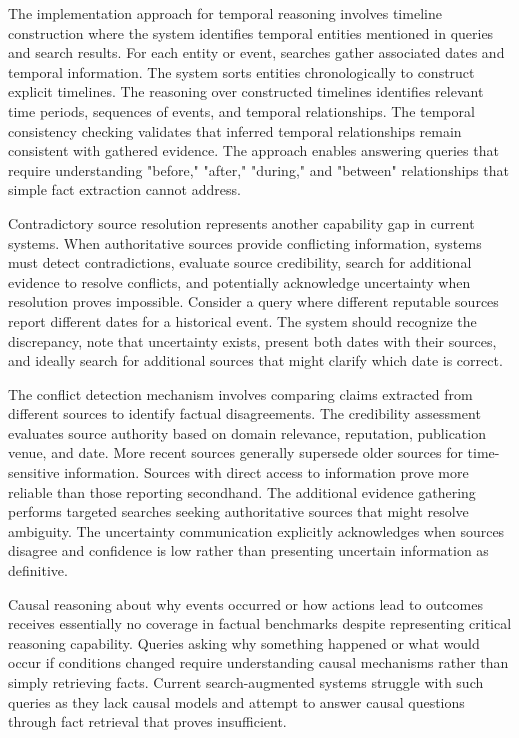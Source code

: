 The implementation approach for temporal reasoning involves timeline construction where the system identifies temporal entities mentioned in queries and search results. For each entity or event, searches gather associated dates and temporal information. The system sorts entities chronologically to construct explicit timelines. The reasoning over constructed timelines identifies relevant time periods, sequences of events, and temporal relationships. The temporal consistency checking validates that inferred temporal relationships remain consistent with gathered evidence. The approach enables answering queries that require understanding "before," "after," "during," and "between" relationships that simple fact extraction cannot address.

Contradictory source resolution represents another capability gap in current systems. When authoritative sources provide conflicting information, systems must detect contradictions, evaluate source credibility, search for additional evidence to resolve conflicts, and potentially acknowledge uncertainty when resolution proves impossible. Consider a query where different reputable sources report different dates for a historical event. The system should recognize the discrepancy, note that uncertainty exists, present both dates with their sources, and ideally search for additional sources that might clarify which date is correct.

The conflict detection mechanism involves comparing claims extracted from different sources to identify factual disagreements. The credibility assessment evaluates source authority based on domain relevance, reputation, publication venue, and date. More recent sources generally supersede older sources for time-sensitive information. Sources with direct access to information prove more reliable than those reporting secondhand. The additional evidence gathering performs targeted searches seeking authoritative sources that might resolve ambiguity. The uncertainty communication explicitly acknowledges when sources disagree and confidence is low rather than presenting uncertain information as definitive.

Causal reasoning about why events occurred or how actions lead to outcomes receives essentially no coverage in factual benchmarks despite representing critical reasoning capability. Queries asking why something happened or what would occur if conditions changed require understanding causal mechanisms rather than simply retrieving facts. Current search-augmented systems struggle with such queries as they lack causal models and attempt to answer causal questions through fact retrieval that proves insufficient.

